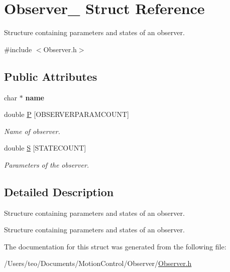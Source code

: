 \hypertarget{struct_observer__}{}\section{Observer\+\_\+ Struct Reference}
\label{struct_observer__}


Structure containing parameters and states of an observer.  




{\ttfamily \#include $<$Observer.\+h$>$}

\subsection*{Public Attributes}
\begin{DoxyCompactItemize}
\item 
\mbox{\label{struct_observer___aa17512aba86dca5595e4b94cbb778f59}} 
char $\ast$ {\bfseries name}
\item 
\mbox{\label{struct_observer___a9f0066ba92a18c48c050002db4bfb904}} 
double \hyperlink{struct_observer___a9f0066ba92a18c48c050002db4bfb904}{P} \mbox{[}O\+B\+S\+E\+R\+V\+E\+R\+P\+A\+R\+A\+M\+C\+O\+U\+NT\mbox{]}
\begin{DoxyCompactList}\small\item\em Name of observer. \end{DoxyCompactList}\item 
\mbox{\label{struct_observer___ad200e9ebb635ac105e2c7ed67734ea31}} 
double \hyperlink{struct_observer___ad200e9ebb635ac105e2c7ed67734ea31}{S} \mbox{[}S\+T\+A\+T\+E\+C\+O\+U\+NT\mbox{]}
\begin{DoxyCompactList}\small\item\em Parameters of the observer. \end{DoxyCompactList}\end{DoxyCompactItemize}


\subsection{Detailed Description}
Structure containing parameters and states of an observer. 

Structure containing parameters and states of an observer. 

The documentation for this struct was generated from the following file\+:\begin{DoxyCompactItemize}
\item 
/\+Users/teo/\+Documents/\+Motion\+Control/\+Observer/\hyperlink{_observer_8h}{Observer.\+h}\end{DoxyCompactItemize}
